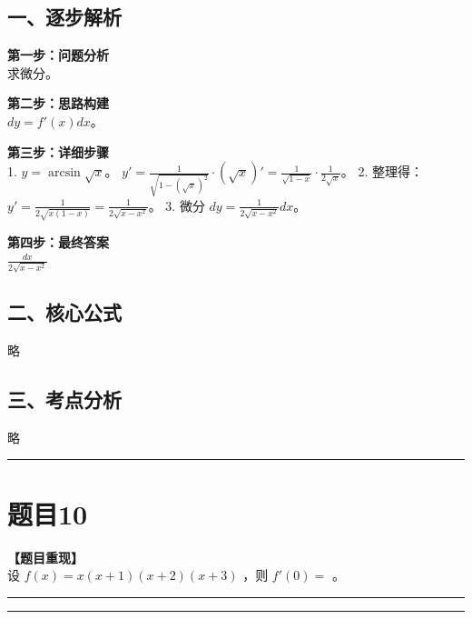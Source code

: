 \documentclass[12pt, a4paper]{ctexart}
\newcommand{\TopSeparator}{
    \par\noindent\rule{\textwidth}{1.5pt}\vspace{0.5em} %
}
\newcommand{\AnalysisSeparator}{
    \par\noindent\rule{\textwidth}{0.5pt}\vspace{0.2em}\hrule\vspace{0.5em} %
}
\newenvironment{RedAnalysis}{
    \par
    \color{red} %
}{
    \par
    \color{black} %
}
\begin{document}
\begin{RedAnalysis}

\subsection*{一、逐步解析}

\textbf{第一步：问题分析} \\
求微分。

\textbf{第二步：思路构建} \\
$dy = f'(x)dx$。

\textbf{第三步：详细步骤} \\
1. $y = \arcsin\sqrt{x}$。
   $y' = \frac{1}{\sqrt{1-(\sqrt{x})^2}} \cdot (\sqrt{x})' = \frac{1}{\sqrt{1-x}} \cdot \frac{1}{2\sqrt{x}}$。
2. 整理得：
   $y' = \frac{1}{2\sqrt{x(1-x)}} = \frac{1}{2\sqrt{x-x^2}}$。
3. 微分 $dy = \frac{1}{2\sqrt{x-x^2}}dx$。

\textbf{第四步：最终答案} \\
$\frac{dx}{2\sqrt{x-x^2}}$

\subsection*{二、核心公式}
略

\subsection*{三、考点分析}
略

\end{RedAnalysis}

\vspace{2em}

\TopSeparator
\section*{题目10}

\textbf{【题目重现】} \\
设 $ f(x) = x(x + 1)(x + 2)(x + 3) $ ，则 $ f'(0) = $ \underline{\hspace{2cm}}。

\AnalysisSeparator
\end{document}
